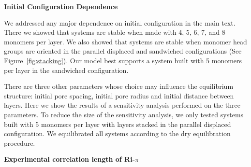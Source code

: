 \documentclass{article}
\begin{document}
  \begingroup
	\fontsize{14pt}{12pt}\selectfont
	\textbf{Initial Configuration Dependence}
  \endgroup

  \vspace{1em}
  We addressed any major dependence on initial configuration in the main text.
  There we showed that systems are stable when made with 4, 5, 6, 7, and 8
  monomers per layer. We also showed that systems are stable when monomer head
  groups are oriented in the parallel displaced and sandwiched configurations
  (See Figure~\ref{fig:stacking}). Our model best supports a system built with 5
  monomers per layer in the sandwiched configuration. 

  There are three other parameters whose choice may influence the equilibrium
  structure: initial pore spacing, initial pore radius and initial distance
  between layers. Here we show the results of a sensitivity analysis performed
  on the three parameters. To reduce the size of the sensitivity analysis, we
  only tested systems built with 5 monomers per layer with layers stacked in 
  the parallel displaced configuration. We equilibrated all systems according
  to the dry equilibration procedure.

  \vspace{1em}
  \begingroup
	\fontsize{14pt}{12pt}\selectfont
	\textbf{Experimental correlation length of Ri-$\pi$}
  \endgroup
  
\end{document}
